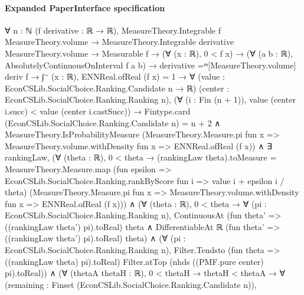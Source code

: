 \documentclass[10pt]{article}
\begin{document}
\paragraph{Expanded PaperInterface specification}
\begin{ReviewVerbatim}
∀ {n : ℕ} (f derivative : ℝ → ℝ),
  MeasureTheory.Integrable f MeasureTheory.volume →
    MeasureTheory.Integrable derivative MeasureTheory.volume →
      Measurable f →
        (∀ (x : ℝ), 0 < f x) →
          (∀ (a b : ℝ), AbsolutelyContinuousOnInterval f a b) →
            derivative =ᵐ[MeasureTheory.volume] deriv f →
              ∫⁻ (x : ℝ), ENNReal.ofReal (f x) = 1 →
                ∀ (value : EconCSLib.SocialChoice.Ranking.Candidate n → ℝ)
                  (center : EconCSLib.SocialChoice.Ranking.Ranking n),
                  (∀ (i : Fin (n + 1)), value (center i.succ) < value (center i.castSucc)) →
                    Fintype.card (EconCSLib.SocialChoice.Ranking.Candidate n) = n + 2 ∧
                      MeasureTheory.IsProbabilityMeasure
                          (MeasureTheory.Measure.pi fun x =>
                            MeasureTheory.volume.withDensity fun x => ENNReal.ofReal (f x)) ∧
                        ∃ rankingLaw,
                          (∀ (theta : ℝ),
                              0 < theta →
                                (rankingLaw theta).toMeasure =
                                  MeasureTheory.Measure.map
                                    (fun epsilon =>
                                      EconCSLib.SocialChoice.Ranking.rankByScore fun i => value i + epsilon i / theta)
                                    (MeasureTheory.Measure.pi fun x =>
                                      MeasureTheory.volume.withDensity fun x => ENNReal.ofReal (f x))) ∧
                            (∀ (theta : ℝ),
                                0 < theta →
                                  ∀ (pi : EconCSLib.SocialChoice.Ranking.Ranking n),
                                    ContinuousAt (fun theta' => ((rankingLaw theta') pi).toReal) theta ∧
                                      DifferentiableAt ℝ (fun theta' => ((rankingLaw theta') pi).toReal) theta) ∧
                              (∀ (pi : EconCSLib.SocialChoice.Ranking.Ranking n),
                                  Filter.Tendsto (fun theta => ((rankingLaw theta) pi).toReal) Filter.atTop
                                    (nhds ((PMF.pure center) pi).toReal)) ∧
                                (∀ (thetaA thetaH : ℝ),
                                    0 < thetaH →
                                      thetaH < thetaA →
                                        ∀ (remaining : Finset (EconCSLib.SocialChoice.Ranking.Candidate n)),

\end{ReviewVerbatim}
\end{document}
